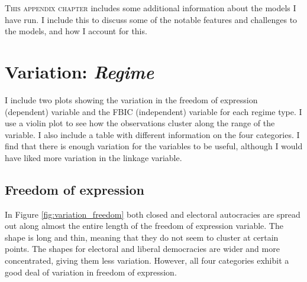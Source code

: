 \lettrine{T}{his appendix chapter} includes some additional information about the models I have run. I include this to discuss some of the notable features and challenges to the models, and how I account for this.

\section{Variation: \textit{Regime}}
I include two plots showing the variation in the freedom of expression (dependent) variable and the FBIC (independent) variable for each regime type. I use a violin plot to see how the observations cluster along the range of the variable. I also include a table with different information on the four categories. I find that there is enough variation for the variables to be useful, although I would have liked more variation in the linkage variable.

\begin{table}[H]
\centering
\caption{Information on freedom of expression and linkages scores for each regime type}
\label{tab:variation}
\end{table}

\subsection{Freedom of expression}
In Figure \ref{fig:variation_freedom} both closed and electoral autocracies are spread out along almost the entire length of the freedom of expression variable. The shape is long and thin, meaning that they do not seem to cluster at certain points. The shapes for electoral and liberal democracies are wider and more concentrated, giving them less variation. However, all four categories exhibit a good deal of variation in freedom of expression.


